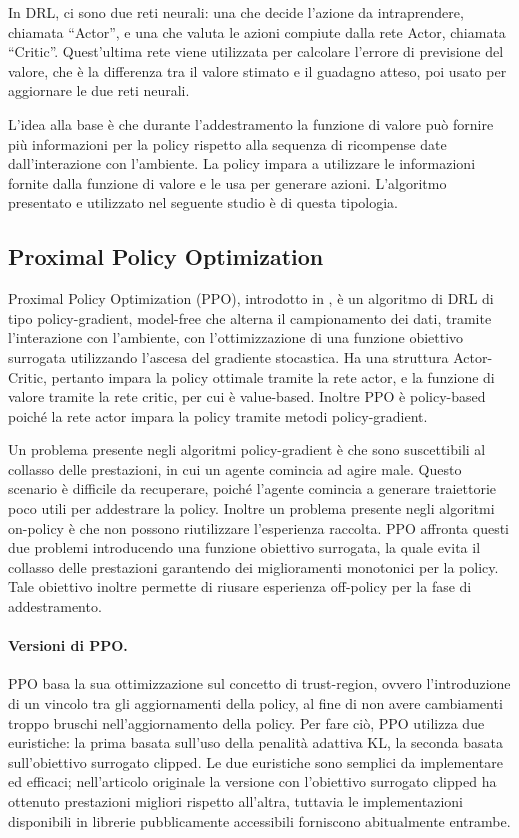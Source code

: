 In DRL, ci sono due reti neurali: una che decide l'azione da intraprendere, chiamata ``Actor'', e una che valuta le azioni compiute dalla rete Actor, chiamata ``Critic''. Quest'ultima rete viene utilizzata per calcolare l'errore di previsione del valore, che è la differenza tra il valore stimato e il guadagno atteso, poi usato per aggiornare le due reti neurali.

L'idea alla base è che durante l'addestramento la funzione di valore può fornire più informazioni per la policy rispetto alla sequenza di ricompense date dall'interazione con l'ambiente. La policy impara a utilizzare le informazioni fornite dalla funzione di valore e le usa per generare azioni. L'algoritmo presentato e utilizzato nel seguente studio è di questa tipologia.

\subsection{Proximal Policy Optimization}
\label{sec:2_ppo}

Proximal Policy Optimization (PPO), introdotto in \cite{Schulman2017}, è un algoritmo di DRL di tipo policy-gradient, model-free che alterna il campionamento dei dati, tramite l'interazione con l'ambiente, con l'ottimizzazione di una funzione obiettivo surrogata utilizzando l'ascesa del gradiente stocastica. Ha una struttura Actor-Critic, pertanto impara la policy ottimale tramite la rete actor, e la funzione di valore tramite la rete critic, per cui è value-based. Inoltre PPO è policy-based poiché la rete actor impara la policy tramite metodi policy-gradient.

Un problema presente negli algoritmi policy-gradient è che sono suscettibili al collasso delle prestazioni, in cui un agente comincia ad agire male. Questo scenario è difficile da recuperare, poiché l'agente comincia a generare traiettorie poco utili per addestrare la policy. Inoltre un problema presente negli algoritmi on-policy è che non possono riutilizzare l'esperienza raccolta. PPO affronta questi due problemi introducendo una funzione obiettivo surrogata, la quale evita il collasso delle prestazioni garantendo dei miglioramenti monotonici per la policy. Tale obiettivo inoltre permette di riusare esperienza off-policy per la fase di addestramento.

\paragraph{Versioni di PPO.} PPO basa la sua ottimizzazione sul concetto di trust-region, ovvero l’introduzione di un vincolo tra gli aggiornamenti della policy, al fine di non avere cambiamenti troppo bruschi nell'aggiornamento della policy. Per fare ciò, PPO utilizza due euristiche: la prima basata sull'uso della penalità adattiva KL, la seconda basata sull'obiettivo surrogato clipped. Le due euristiche sono semplici da implementare ed efficaci; nell'articolo originale la versione con l'obiettivo surrogato clipped ha ottenuto prestazioni migliori rispetto all'altra, tuttavia le implementazioni disponibili in librerie pubblicamente accessibili forniscono abitualmente entrambe.

